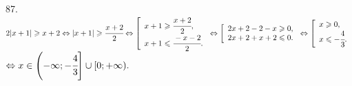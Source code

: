 87. $2|x+1|\geqslant x+2\Leftrightarrow |x+1|\geqslant \cfrac{x+2}{2} \Leftrightarrow \left[\begin{array}{l} x+1\geqslant \cfrac{x+2}{2},\\
x+1\leqslant \cfrac{-x-2}{2}.\end{array}\right. \Leftrightarrow \left[\begin{array}{l} 2x+2-2-x\geqslant 0,\\
2x+2+x+2\leqslant 0.\end{array}\right. \Leftrightarrow \left[\begin{array}{l} x\geqslant 0,\\
x\leqslant -\cfrac{4}{3}.\end{array}\right.$\\$ \Leftrightarrow x\in\left(-\infty;-\cfrac{4}{3}\right]\cup[0;+\infty).$\\
